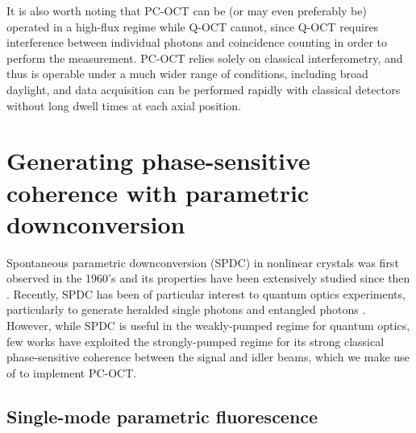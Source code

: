 It is also worth noting that PC-OCT can be (or may even preferably be) operated in a high-flux regime while Q-OCT cannot, since Q-OCT requires interference between individual photons and coincidence counting in order to perform the measurement. PC-OCT relies solely on classical interferometry, and thus is operable under a much wider range of conditions, including broad daylight, and data acquisition can be performed rapidly with classical detectors without long dwell times at each axial position.

\section{Generating phase-sensitive coherence with parametric downconversion}

Spontaneous parametric downconversion (SPDC) in nonlinear crystals was first observed in the 1960's and its properties have been extensively studied since then \cite{louisell-spdc,harris-spdc,magde-spdc,akhmanov-spdc,byer-spdc,burnham-spdc,tapster-spdc}. Recently, SPDC has been of particular interest to quantum optics experiments, particularly to generate heralded single photons \cite{fasel-spdc,pittman-spdc} and entangled photons \cite{kurtsiefer-spdc,wong-spdc}. However, while SPDC is useful in the weakly-pumped regime for quantum optics, few works have exploited the strongly-pumped regime for its strong classical phase-sensitive coherence between the signal and idler beams, which we make use of to implement PC-OCT.

\subsection{Single-mode parametric fluorescence}

